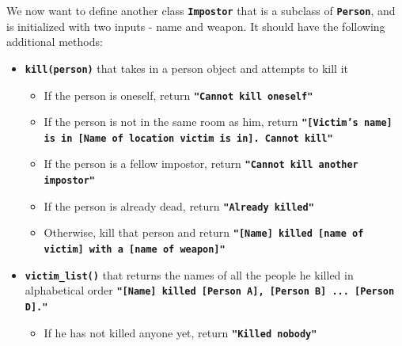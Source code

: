 We now want to define another class \texttt{\bfseries Impostor} that is a subclass of \texttt{\bfseries Person}, and is
initialized with two inputs - name and weapon. It should have the following additional methods:
\begin{itemize}
\item \texttt{\bfseries kill(person)} that takes in a person object and attempts to kill it
\begin{itemize}
\item If the person is oneself, return \texttt{\bfseries "Cannot kill oneself"}
\item If the person is not in the same room as him, return \texttt{\bfseries "[Victim's name] is
in [Name of location victim is in]. Cannot kill"}
\item If the person is a fellow impostor, return \texttt{\bfseries "Cannot kill another impostor"}
\item If the person is already dead, return \texttt{\bfseries "Already killed"}
\item Otherwise, kill that person and return \texttt{\bfseries "[Name] killed [name of victim] with a [name of weapon]"}
\end{itemize}
\item \texttt{\bfseries victim\_list()} that returns the names of all the people he killed in alphabetical
order \texttt{\bfseries "[Name] killed [Person A], [Person B] ... [Person D]."}
\begin{itemize}
\item If he has not killed anyone yet, return \texttt{\bfseries "Killed nobody"}
\end{itemize}
\end{itemize}

\newpage

